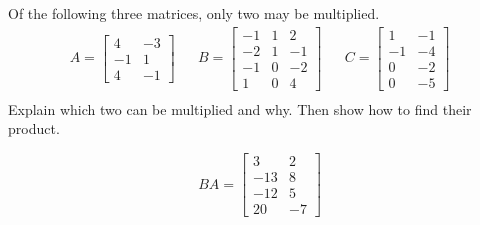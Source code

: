 
\begin{exerciseStatement}


Of the following three matrices, only two may be multiplied. 
\begin{align*} A= \left[\begin{array}{cc}
4 & -3 \\
-1 & 1 \\
4 & -1
\end{array}\right]  & & B= \left[\begin{array}{ccc}
-1 & 1 & 2 \\
-2 & 1 & -1 \\
-1 & 0 & -2 \\
1 & 0 & 4
\end{array}\right]  & & C= \left[\begin{array}{cc}
1 & -1 \\
-1 & -4 \\
0 & -2 \\
0 & -5
\end{array}\right]  \\ \end{align*}
             Explain which two can be multiplied and why. Then show how to find their product.


\end{exerciseStatement}
    
\begin{exerciseAnswer} 
\[BA= \left[\begin{array}{cc}
3 & 2 \\
-13 & 8 \\
-12 & 5 \\
20 & -7
\end{array}\right] \]
\end{exerciseAnswer}
    
